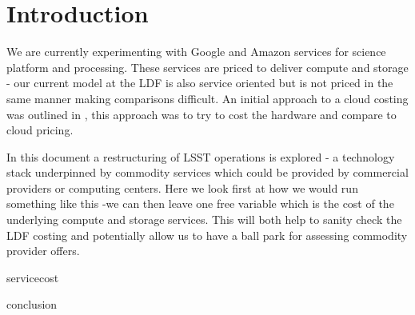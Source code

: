 \section{Introduction} \label{sec:intro}

We are currently experimenting with Google and Amazon services for science platform and processing.
These services are priced to deliver compute and storage - our current model at the \gls{LDF} is also service oriented but
is not priced in the same manner making comparisons difficult.
An initial approach to a \gls{cloud} costing was outlined in , this approach was to try to cost the hardware and compare to \gls{cloud} pricing.

In this document a restructuring of \gls{LSST} operations is explored - a technology \gls{stack} underpinned by commodity services which could be provided by commercial providers or computing centers. Here we look first at how we would run something like this -we can then leave one free variable which is the cost of the underlying compute and storage services. This will both help to
sanity check the \gls{LDF} costing and potentially allow us to have a ball park for assessing commodity provider offers.



 {servicecost}


 {conclusion}


